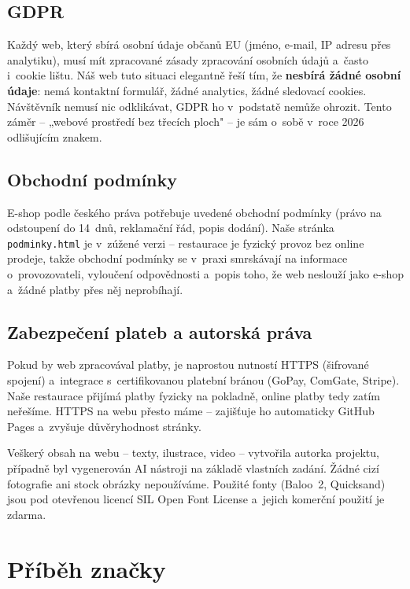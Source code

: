\documentclass[12pt,a4paper]{article}
\begin{document}
\subsection{GDPR}

Každý web, který sbírá osobní údaje občanů EU (jméno, e-mail, IP adresu přes analytiku), musí mít zpracované zásady zpracování osobních údajů a~často i~cookie lištu. Náš web tuto situaci elegantně řeší tím, že \textbf{nesbírá žádné osobní údaje}: nemá kontaktní formulář, žádné analytics, žádné sledovací cookies. Návštěvník nemusí nic odklikávat, GDPR ho v~podstatě nemůže ohrozit. Tento záměr -- „webové prostředí bez třecích ploch" -- je sám o~sobě v~roce 2026 odlišujícím znakem.

\subsection{Obchodní podmínky}

E-shop podle českého práva potřebuje uvedené obchodní podmínky (právo na odstoupení do 14~dnů, reklamační řád, popis dodání). Naše stránka \texttt{podminky.html} je v~zúžené verzi -- restaurace je fyzický provoz bez online prodeje, takže obchodní podmínky se v~praxi smrskávají na informace o~provozovateli, vyloučení odpovědnosti a~popis toho, že web neslouží jako e-shop a~žádné platby přes něj neprobíhají.

\subsection{Zabezpečení plateb a autorská práva}

Pokud by web zpracovával platby, je naprostou nutností HTTPS (šifrované spojení) a~integrace s~certifikovanou platební bránou (GoPay, ComGate, Stripe). Naše restaurace přijímá platby fyzicky na pokladně, online platby tedy zatím neřešíme. HTTPS na webu přesto máme -- zajišťuje ho automaticky GitHub Pages a~zvyšuje důvěryhodnost stránky.

Veškerý obsah na webu -- texty, ilustrace, video -- vytvořila autorka projektu, případně byl vygenerován AI nástroji na základě vlastních zadání. Žádné cizí fotografie ani stock obrázky nepoužíváme. Použité fonty (Baloo~2, Quicksand) jsou pod otevřenou licencí SIL Open Font License a~jejich komerční použití je zdarma.

\section{Příběh značky}
\end{document}
